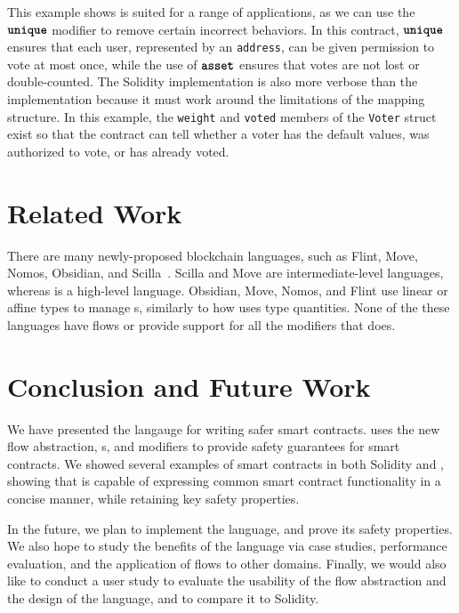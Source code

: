 \documentclass[nonacm, dvipsnames, usenames, sigconf]{acmart}
\begin{document}
This example shows \langName is suited for a range of applications, as we can use the $\textbf{\texttt{unique}}$ modifier to remove certain incorrect behaviors.
In this contract, $\textbf{\texttt{unique}}$ ensures that each user, represented by an \lstinline{address}, can be given permission to vote at most once, while the use of $\textbf{\texttt{asset}}$ ensures that votes are not lost or double-counted.
The Solidity implementation is also more verbose than the \langName implementation because it must work around the limitations of the mapping structure.
In this example, the \lstinline{weight} and \lstinline{voted} members of the \lstinline{Voter} struct exist so that the contract can tell whether a voter has the default values, was authorized to vote, or has already voted.

\section{Related Work}
There are many newly-proposed blockchain languages, such as Flint, Move, Nomos, Obsidian, and Scilla~\cite{schrans2018flint, blackshear2019move, das2019nomos, coblenz2019obsidian, sergey2019scilla}.
Scilla and Move are intermediate-level languages, whereas \langName is a high-level language.
Obsidian, Move, Nomos, and Flint use linear or affine types to manage \assetTxt{}s, similarly to how \langName uses type quantities.
None of the these languages have flows or provide support for all the modifiers that \langName does.

\section{Conclusion and Future Work}

We have presented the \langName langauge for writing safer smart contracts.
\langName uses the new flow abstraction, \assetTxt{}s, and modifiers to provide safety guarantees for smart contracts.
We showed several examples of smart contracts in both Solidity and \langName, showing that \langName is capable of expressing common smart contract functionality in a concise manner, while retaining key safety properties.

In the future, we plan to implement the \langName language, and prove its safety properties.
We also hope to study the benefits of the language via case studies, performance evaluation, and the application of flows to other domains.
Finally, we would also like to conduct a user study to evaluate the usability of the flow abstraction and the design of the language, and to compare it to Solidity.



\end{document}
